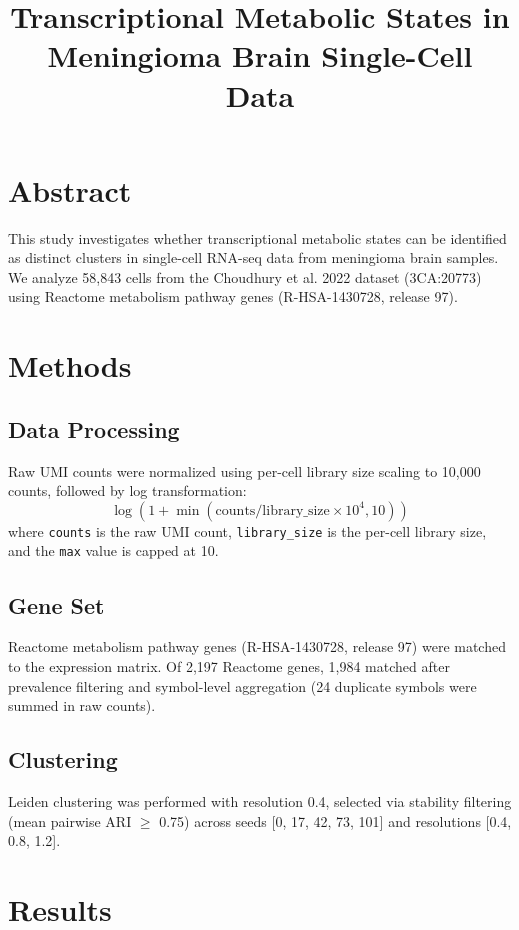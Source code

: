 \documentclass[sloppy,11pt]{article}
\title{\textbf{Transcriptional Metabolic States in Meningioma Brain Single-Cell Data}}
\author{}
\date{}
\begin{document}
\sloppy

\maketitle

\section{Abstract}
This study investigates whether transcriptional metabolic states can be identified as distinct clusters in single-cell RNA-seq data from meningioma brain samples. We analyze 58,843 cells from the Choudhury et al. 2022 dataset (3CA:20773) using Reactome metabolism pathway genes (R-HSA-1430728, release 97).

\section{Methods}
\subsection{Data Processing}
Raw UMI counts were normalized using per-cell library size scaling to 10,000 counts, followed by log transformation:
\begin{equation}
\label{eq:normalization}
\log(1 + \min(\text{counts} / \text{library\_size} \times 10^4, 10))
\end{equation}
where \texttt{counts} is the raw UMI count, \texttt{library\_size} is the per-cell library size, and the \texttt{max} value is capped at 10.

\subsection{Gene Set}
Reactome metabolism pathway genes (R-HSA-1430728, release 97) were matched to the expression matrix. Of 2,197 Reactome genes, 1,984 matched after prevalence filtering and symbol-level aggregation (24 duplicate symbols were summed in raw counts).

\subsection{Clustering}
Leiden clustering was performed with resolution 0.4, selected via stability filtering (mean pairwise ARI $\ge$ 0.75) across seeds [0, 17, 42, 73, 101] and resolutions [0.4, 0.8, 1.2].

\section{Results}
\end{document}
